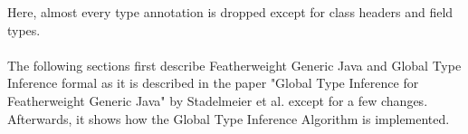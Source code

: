 Here, almost every type annotation is dropped except for class headers and field types.
\\
\\
The following sections first describe Featherweight Generic Java and Global Type Inference formal as it is described in the paper "Global Type Inference for Featherweight Generic Java"\cite{FGJ} by Stadelmeier et al. except for a few changes. Afterwards, it shows how the Global Type Inference Algorithm is implemented.
